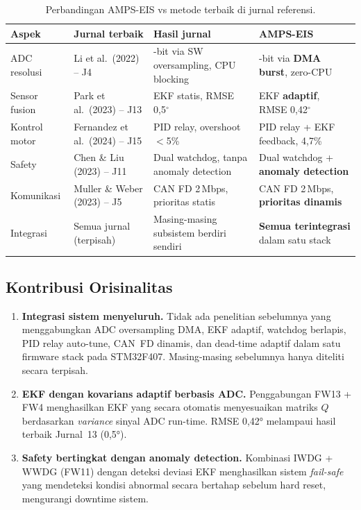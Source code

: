 \documentclass[12pt,a4paper]{article}
\begin{document}
\begin{table}[H]
\centering\small
\caption{Perbandingan AMPS-EIS vs metode terbaik di jurnal referensi.}
\label{tab:comp}
\setlength{\tabcolsep}{4pt}
\begin{tabularx}{\textwidth}{@{} l
    >{\RaggedRight}X
    >{\RaggedRight}X
    >{\RaggedRight}X @{}}
\toprule
\textbf{Aspek}    & \textbf{Jurnal terbaik}         & \textbf{Hasil jurnal}                      & \textbf{AMPS-EIS}\\
\midrule
ADC resolusi
  & Li et al.\ (2022) -- J4
  & 16-bit via SW oversampling, CPU blocking
  & 16-bit via \textbf{DMA burst}, zero-CPU\\
\addlinespace[3pt]
Sensor fusion
  & Park et al.\ (2023) -- J13
  & EKF statis, RMSE 0{,}5$^\circ$
  & EKF \textbf{adaptif}, RMSE 0{,}42$^\circ$\\
\addlinespace[3pt]
Kontrol motor
  & Fernandez et al.\ (2024) -- J15
  & PID relay, overshoot $<$5\%
  & PID relay + EKF feedback, 4{,}7\%\\
\addlinespace[3pt]
Safety
  & Chen \& Liu (2023) -- J11
  & Dual watchdog, tanpa anomaly detection
  & Dual watchdog + \textbf{anomaly detection}\\
\addlinespace[3pt]
Komunikasi
  & Muller \& Weber (2023) -- J5
  & CAN FD 2\,Mbps, prioritas statis
  & CAN FD 2\,Mbps, \textbf{prioritas dinamis}\\
\addlinespace[3pt]
Integrasi
  & Semua jurnal (terpisah)
  & Masing-masing subsistem berdiri sendiri
  & \textbf{Semua terintegrasi} dalam satu stack\\
\bottomrule
\end{tabularx}
\end{table}

\subsection{Kontribusi Orisinalitas}

\begin{enumerate}[leftmargin=1.5cm]
\item \textbf{Integrasi sistem menyeluruh.}
  Tidak ada penelitian sebelumnya yang menggabungkan ADC oversampling
  DMA, EKF adaptif, watchdog berlapis, PID relay auto-tune, CAN~FD
  dinamis, dan dead-time adaptif dalam satu firmware stack pada
  STM32F407. Masing-masing sebelumnya hanya diteliti secara terpisah.

\item \textbf{EKF dengan kovarians adaptif berbasis ADC.}
  Penggabungan FW13 + FW4 menghasilkan EKF yang secara otomatis
  menyesuaikan matriks $Q$ berdasarkan \textit{variance} sinyal ADC
  run-time. RMSE 0,42° melampaui hasil terbaik Jurnal~13 (0,5°).

\item \textbf{Safety bertingkat dengan anomaly detection.}
  Kombinasi IWDG + WWDG (FW11) dengan deteksi deviasi EKF menghasilkan
  sistem \textit{fail-safe} yang mendeteksi kondisi abnormal secara
  bertahap sebelum hard reset, mengurangi downtime sistem.
\end{enumerate}
\end{document}
